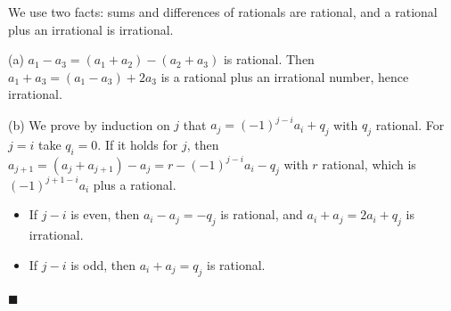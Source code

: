 We use two facts: sums and differences of rationals are rational, and a rational plus an irrational is irrational.

(a) $a_1-a_3=(a_1+a_2)-(a_2+a_3)$ is rational. Then $a_1+a_3=(a_1-a_3)+2a_3$ is a rational plus an irrational number, hence irrational.

(b) We prove by induction on $j$ that $a_j=(-1)^{j-i}a_i+q_j$ with $q_j$ rational. For $j=i$ take $q_i=0$. If it holds for $j$, then $a_{j+1}=(a_j+a_{j+1})-a_j=r-(-1)^{j-i}a_i-q_j$ with $r$ rational, which is $(-1)^{j+1-i}a_i$ plus a rational.
\begin{itemize}
\item If $j-i$ is even, then $a_i-a_j=-q_j$ is rational, and $a_i+a_j=2a_i+q_j$ is irrational.
\item If $j-i$ is odd, then $a_i+a_j=q_j$ is rational.
\end{itemize}
$\blacksquare$
